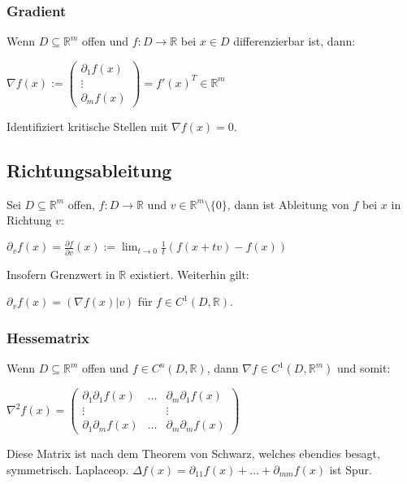 \subsubsection*{Gradient}

Wenn $D \subseteq \mathbb{R}^m$ offen und $f : D \rightarrow \mathbb{R}$ bei $x \in D$ differenzierbar ist, dann:

$\nabla f(x) := \begin{pmatrix} \partial_1 f(x) \\ \vdots \\ \partial_m f(x) \end{pmatrix} = f'(x)^T \in \mathbb{R}^m$

Identifiziert kritische Stellen mit $\nabla f(x) = 0$.

\subsection*{Richtungsableitung}

Sei $D \subseteq \mathbb{R}^m$ offen, $f : D \rightarrow \mathbb{R}$ und $v \in \mathbb{R}^m \setminus \{0\}$, dann ist Ableitung von $f$ bei $x$ in Richtung $v$:

$\partial_v f(x) = \frac{\partial f}{\partial v}(x) := \displaystyle\lim_{t \to 0} \frac{1}{t} (f(x+tv)-f(x))$

Insofern Grenzwert in $\mathbb{R}$ existiert. Weiterhin gilt:

$\partial_v f(x) = (\nabla f(x) | v)$ für $f \in C^1(D, \mathbb{R})$.

\subsubsection*{Hessematrix}

Wenn $D \subseteq \mathbb{R}^m$ offen und $f \in C^n(D, \mathbb{R})$, dann $\nabla f \in C^1(D,\mathbb{R}^m)$ und somit:

$\nabla^2 f(x) = \begin{pmatrix} \partial_1 \partial_1 f(x) & \hdots & \partial_m \partial_1 f(x) \\ \vdots & & \vdots \\ \partial_1 \partial_m f(x) & \hdots & \partial_m \partial_m f(x) \end{pmatrix}$

	Diese Matrix ist nach dem Theorem von Schwarz, welches ebendies besagt, symmetrisch. Laplaceop. $\Delta f(x) = \partial_{11}f(x) + ... + \partial_{mm} f(x)$ ist Spur.

